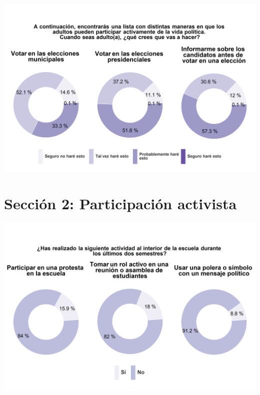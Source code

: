 \documentclass[
  14pt,
]{book}
\begin{document}
\begin{center}\includegraphics[width=52.49in]{images/graph_partform_fut} \end{center}

\hypertarget{secciuxf3n-2-participaciuxf3n-activista}{%
\section{Sección 2: Participación activista}\label{secciuxf3n-2-participaciuxf3n-activista}}

\begin{center}\includegraphics[width=52.49in]{images/graph_partact_esc} \end{center}
\end{document}
